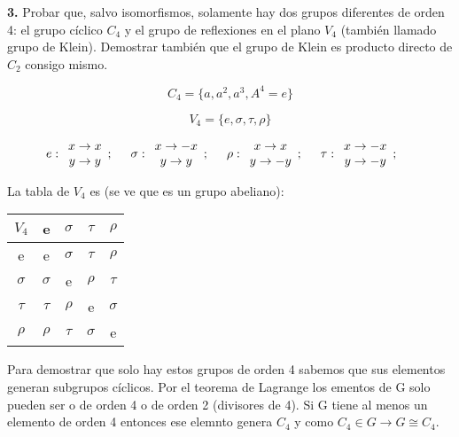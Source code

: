 \documentclass{article}
\begin{document}
\bigskip
\textbf{3.} Probar que, salvo isomorfismos, solamente hay dos grupos diferentes de orden 4: el grupo cíclico $C_4$ y el grupo de
reflexiones en el plano $V_4$ (también llamado grupo de Klein). Demostrar también que el grupo de Klein es producto
directo de $C_2$ consigo mismo.

\smallskip
$$C_4=\lbrace  a,a^2,a^3,A^4=e\rbrace$$

$$V_4=\lbrace e,\sigma ,\tau ,\rho \rbrace$$

$$e: \begin{array}{c}
x\to x  \\
y\to y
\end{array}; \hspace{0.5cm} \sigma : \begin{array}{c}
x\to -x  \\
y\to y
\end{array}; \hspace{0.5cm} \rho : \begin{array}{c}
x\to x  \\
y\to -y
\end{array}; \hspace{0.5cm} \tau : \begin{array}{c}
x\to -x  \\
y\to -y
\end{array}; \hspace{0.5cm}$$

\smallskip
La tabla de $V_4$ es (se ve que es un grupo abeliano):

\begin{center}
\begin{tabular}[b]{ c | c c c c }
$V_4$ & e & $\sigma $ & $\tau $ & $\rho $\\
\hline
e & e & $\sigma $ & $\tau $ & $\rho $ \\
$\sigma $ & $\sigma $ & e & $\rho $ & $\tau $ \\
$\tau $ & $\tau $ & $\rho $ & e & $\sigma $ \\
$\rho $ & $\rho $ & $\tau $ & $\sigma $ & e
\end{tabular}
\end{center}


\smallskip
Para demostrar que solo hay estos grupos de orden 4 sabemos que sus elementos generan subgrupos cíclicos. Por el teorema de Lagrange los ementos de G solo pueden ser o de orden 4 o de orden 2 (divisores de 4). Si G tiene al menos un elemento de orden 4 entonces ese elemnto genera $C_4$ y como $C_4 \in G \to G \cong C_4$.
\end{document}
